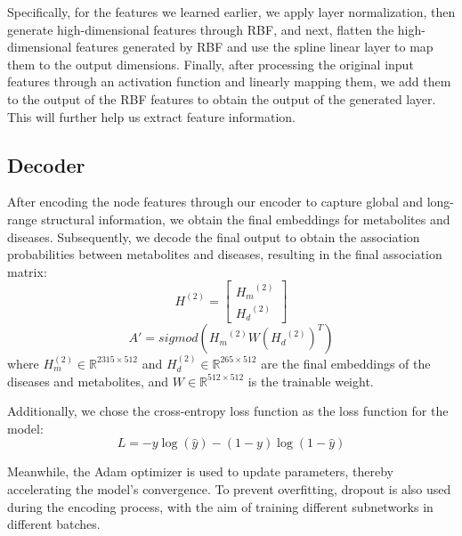 \documentclass[lettersize,journal]{IEEEtran}
\begin{document}
Specifically, for the features we learned earlier, we apply layer normalization, then generate high-dimensional features through RBF, and next, flatten the high-dimensional features generated by RBF and use the spline linear layer to map them to the output dimensions. Finally, after processing the original input features through an activation function and linearly mapping them, we add them to the output of the RBF features to obtain the output of the generated layer. This will further help us extract feature information.

\subsection{\textbf{Decoder}}
After encoding the node features through our encoder to capture global and long-range structural information, we obtain the final embeddings for metabolites and diseases. Subsequently, we decode the final output to obtain the association probabilities between metabolites and diseases, resulting in the final association matrix:
\begin{equation}
	H^{(2)} = \begin{bmatrix} {H_m}^{(2)}  \\ {H_d}^{(2)} \end{bmatrix}	
\end{equation}
\begin{equation}
	A' = sigmod \left({H_m}^{(2)} W  {({H_d}^{(2)})}^T \right)
\end{equation}
where \( H^{(2)}_m \in \mathbb{R}^{2315 \times 512} \) and \( H^{(2)}_d \in \mathbb{R}^{265 \times 512} \) are the final embeddings of the diseases and metabolites, and \( W \in \mathbb{R}^{512 \times 512} \) is the trainable weight.

Additionally, we chose the cross-entropy loss function \cite{mao2023cross} as the loss function for the model:
\begin{equation}
L = -y \log(\hat{y}) - (1 - y) \log(1 - \hat{y})
\end{equation}

Meanwhile, the Adam optimizer \cite{kingma2014adam} is used to update parameters, thereby accelerating the model's convergence. To prevent overfitting, dropout\cite{baldi2013understanding} is also used during the encoding process, with the aim of training different subnetworks in different batches.





\end{document}
